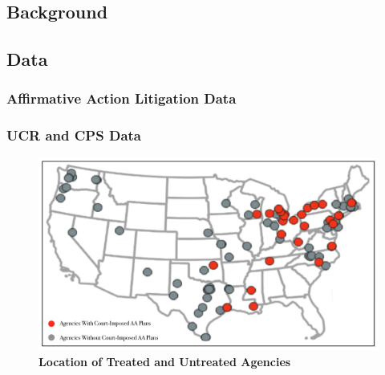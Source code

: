 \documentclass[12pt, letterpage]{article}
\begin{document}
\subsection{Background}

\subsection{Data}

\subsubsection{Affirmative Action Litigation Data}

\subsubsection{UCR and CPS Data}

\begin{figure}[h!]
\centering
\includegraphics[width=0.78\linewidth]{AAFigures/map.png}
\caption{\textbf{Location of Treated and Untreated Agencies}}
\label{fig:map}
\end{figure}
\end{document}
